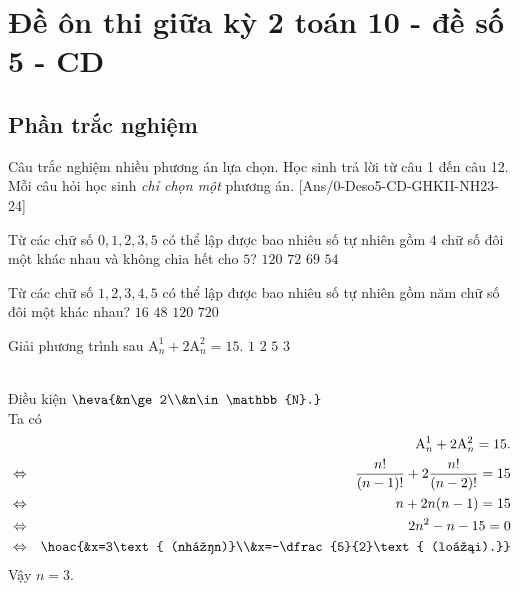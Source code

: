 \section{Đề ôn thi giữa kỳ 2 toán 10 - đề số 5 - CD}
\subsection{Phần trắc nghiệm}
Câu trắc nghiệm nhiều phương án lựa chọn. Học sinh trả lời từ
câu 1 đến câu 12. Mỗi câu hỏi học sinh \textit{chỉ chọn một} phương án.
[Ans/0-Deso5-CD-GHKII-NH23-24]
\hienthiloigiaiex
\begin{ex} %
	Từ các chữ số $0,1,2,3,5$ có thể lập được bao nhiêu số tự nhiên gồm $4$ chữ số đôi một khác nhau và không chia hết cho $5$?
	\choice
	{$120$}
	{$72$}
	{$69$}
	{\True $54$}
\end{ex}
\begin{ex} %
	Từ các chữ số $1,2,3, 4, 5$ có thể lập được bao nhiêu số tự nhiên gồm năm chữ số đôi một khác nhau?
	\choice
	{$16$}
	{$48$}
	{\True $120$}
	{$720$}
\end{ex}
\begin{ex} %
	Giải phương trình sau $\mathrm{A}_n^1+2\mathrm{A}_n^2=15.$
	\choice
	{$1$}
	{$2$}
	{$5$}
	{\True $3$}
	\loigiai
	{
		\\
		Điều kiện $\heva{&n\ge2\\&n\in\mathbb{N}.}$\\
		Ta có 
		\begin{eqnarray*}
			& &\mathrm{A}_n^1+2\mathrm{A}_n^2=15.\\
			& \Leftrightarrow & \dfrac{n!}{(n-1)!}+2\dfrac{n!}{(n-2)!}=15\\
			& \Leftrightarrow &n+2n(n-1)=15\\
			& \Leftrightarrow & 2n^2-n-15=0\\
			&\Leftrightarrow&\hoac{&x=3\text{ (nhận)}\\&x=-\dfrac{5}{2}\text{ (loại).}}\\
		\end{eqnarray*}
		Vậy $n=3$.
		
	}
\end{ex}

